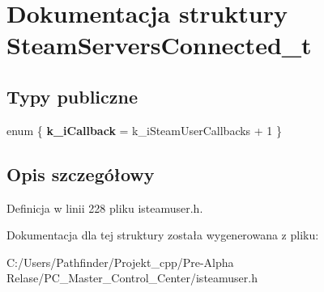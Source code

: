 \hypertarget{struct_steam_servers_connected__t}{}\section{Dokumentacja struktury Steam\+Servers\+Connected\+\_\+t}
\label{struct_steam_servers_connected__t}
\subsection*{Typy publiczne}
\begin{DoxyCompactItemize}
\item 
\mbox{\label{struct_steam_servers_connected__t_a9c74d174706eeaf2a760504ef462fd03}} 
enum \{ {\bfseries k\+\_\+i\+Callback} = k\+\_\+i\+Steam\+User\+Callbacks + 1
 \}
\end{DoxyCompactItemize}


\subsection{Opis szczegółowy}


Definicja w linii 228 pliku isteamuser.\+h.



Dokumentacja dla tej struktury została wygenerowana z pliku\+:\begin{DoxyCompactItemize}
\item 
C\+:/\+Users/\+Pathfinder/\+Projekt\+\_\+cpp/\+Pre-\/\+Alpha Relase/\+P\+C\+\_\+\+Master\+\_\+\+Control\+\_\+\+Center/isteamuser.\+h\end{DoxyCompactItemize}
